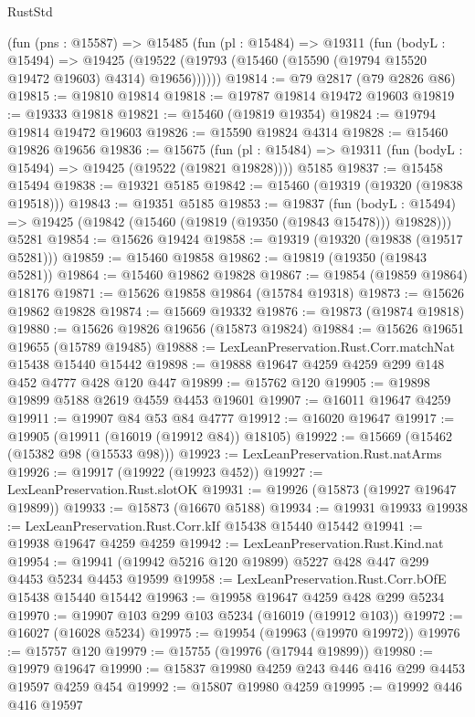 \begin{lexlean}{RustStd}
\begin{coremodule}
    (fun (pns : @15587) =>
    @15485
      (fun (pl : @15484) =>
      @19311
        (fun (bodyL : @15494) =>
        @19425 (@19522 (@19793 (@15460 (@15590 (@19794 @15520 @19472 @19603) @4314) @19656))))))
@19814 := @79 @2817 (@79 @2826 @86)
@19815 := @19810 @19814
@19818 := @19787 @19814 @19472 @19603
@19819 := @19333 @19818
@19821 := @15460 (@19819 @19354)
@19824 := @19794 @19814 @19472 @19603
@19826 := @15590 @19824 @4314
@19828 := @15460 @19826 @19656
@19836 := @15675
    (fun (pl : @15484) => @19311 (fun (bodyL : @15494) => @19425 (@19522 (@19821 @19828))))
    @5185
@19837 := @15458 @15494
@19838 := @19321 @5185
@19842 := @15460 (@19319 (@19320 (@19838 @19518)))
@19843 := @19351 @5185
@19853 := @19837
    (fun (bodyL : @15494) => @19425 (@19842 (@15460 (@19819 (@19350 (@19843 @15478))) @19828)))
    @5281
@19854 := @15626 @19424
@19858 := @19319 (@19320 (@19838 (@19517 @5281)))
@19859 := @15460 @19858
@19862 := @19819 (@19350 (@19843 @5281))
@19864 := @15460 @19862 @19828
@19867 := @19854 (@19859 @19864) @18176
@19871 := @15626 @19858 @19864 (@15784 @19318)
@19873 := @15626 @19862 @19828
@19874 := @15669 @19332
@19876 := @19873 (@19874 @19818)
@19880 := @15626 @19826 @19656 (@15873 @19824)
@19884 := @15626 @19651 @19655 (@15789 @19485)
@19888 := LexLeanPreservation.Rust.Corr.matchNat @15438 @15440 @15442
@19898 := @19888 @19647 @4259 @4259 @299 @148 @452 @4777 @428 @120 @447
@19899 := @15762 @120
@19905 := @19898 @19899 @5188 @2619 @4559 @4453 @19601
@19907 := @16011 @19647 @4259
@19911 := @19907 @84 @53 @84 @4777
@19912 := @16020 @19647
@19917 := @19905 (@19911 (@16019 (@19912 @84)) @18105)
@19922 := @15669 (@15462 (@15382 @98 (@15533 @98)))
@19923 := LexLeanPreservation.Rust.natArms
@19926 := @19917 (@19922 (@19923 @452))
@19927 := LexLeanPreservation.Rust.slotOK
@19931 := @19926 (@15873 (@19927 @19647 @19899))
@19933 := @15873 (@16670 @5188)
@19934 := @19931 @19933
@19938 := LexLeanPreservation.Rust.Corr.kIf @15438 @15440 @15442
@19941 := @19938 @19647 @4259 @4259
@19942 := LexLeanPreservation.Rust.Kind.nat
@19954 := @19941 (@19942 @5216 @120 @19899) @5227 @428 @447 @299 @4453 @5234 @4453 @19599
@19958 := LexLeanPreservation.Rust.Corr.bOfE @15438 @15440 @15442
@19963 := @19958 @19647 @4259 @428 @299 @5234
@19970 := @19907 @103 @299 @103 @5234 (@16019 (@19912 @103))
@19972 := @16027 (@16028 @5234)
@19975 := @19954 (@19963 (@19970 @19972))
@19976 := @15757 @120
@19979 := @15755 (@19976 (@17944 @19899))
@19980 := @19979 @19647
@19990 := @15837 @19980 @4259 @243 @446 @416 @299 @4453 @19597 @4259 @454
@19992 := @15807 @19980 @4259
@19995 := @19992 @446 @416 @19597

\end{coremodule}
\end{lexlean}
